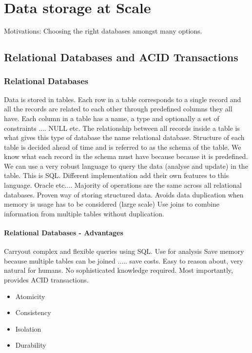 \documentclass[a4paper, 11pt]{book}
\begin{document}
    \chapter{Data storage at Scale}
    Motivations: Choosing the right databases amongst many options.


    \section{Relational Databases and ACID Transactions}

    \subsection{Relational Databases}
    Data is stored in tables.
    Each row in a table corresponds to a single record and all the records are related to each other through predefined columns they all have.
    Each column in a table has a name, a type and optionally a set of constraints .... NULL etc.
    The relationship between all records inside a table is what gives this type of database the name relational database.
    Structure of each table is decided ahead of time and is referred to as the schema of the table.
    We know what each record in the schema must have because because it is predefined.
    We can use a very robust language to query the data (analyse and update) in the table.
    This is SQL.
    Different implementation add their own features to this language.
    Oracle etc....
    Majority of operations are the same across all relational databases.
    Proven way of storing structured data.
    Avoids data duplication when memory is usage has to be considered (large scale)
    Use joins to combine information from multiple tables without duplication.

    \subsubsection{Relational Databases - Advantages}
    Carryout complex and flexible queries using SQL. Use for analysis
    Save memory because multiple tables can be joined ..... save costs.
    Easy to reason about, very natural for humans.
    No sophisticated knowledge required.
    Most importantly, provides ACID transactions.

    \begin{itemize}
        \item Atomicity
        \item Consistency
        \item Isolation
        \item Durability
    \end{itemize}
\end{document}
